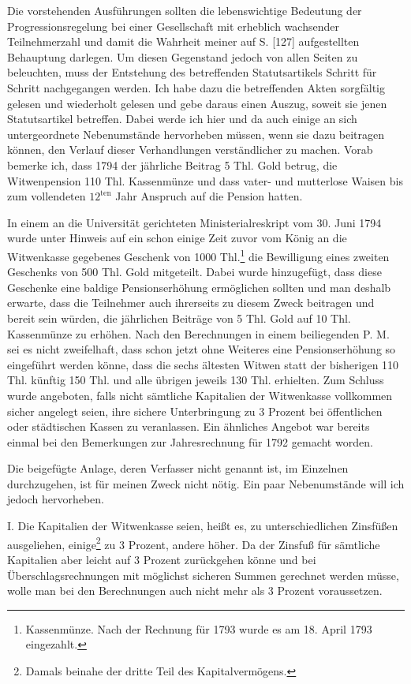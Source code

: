 Die vorstehenden Ausführungen sollten die lebenswichtige Bedeutung der Progressionsregelung bei einer Gesellschaft mit erheblich wachsender Teilnehmerzahl und damit die Wahrheit meiner auf S. [127] aufgestellten Behauptung darlegen. Um diesen Gegenstand jedoch von allen Seiten zu beleuchten, muss der Entstehung des betreffenden Statutsartikels Schritt für Schritt nachgegangen werden. Ich habe dazu die betreffenden Akten sorgfältig gelesen und wiederholt gelesen und gebe daraus einen Auszug, soweit sie jenen Statutsartikel betreffen. Dabei werde ich hier und da auch einige an sich untergeordnete Nebenumstände hervorheben müssen, wenn sie dazu beitragen können, den Verlauf dieser Verhandlungen verständlicher zu machen. Vorab bemerke ich, dass 1794 der jährliche Beitrag 5 Thl. Gold betrug, die Witwenpension 110 Thl. Kassenmünze und dass vater- und mutterlose Waisen bis zum vollendeten \(12^{\text{ten}}\) Jahr Anspruch auf die Pension hatten.

In einem an die Universität gerichteten Ministerialreskript vom 30. Juni 1794 wurde unter Hinweis auf ein schon einige Zeit zuvor vom König an die Witwenkasse gegebenes Geschenk von 1000 Thl.\footnote{Kassenmünze. Nach der Rechnung für 1793 wurde es am 18. April 1793 eingezahlt.} die Bewilligung eines zweiten Geschenks von 500 Thl. Gold mitgeteilt. Dabei wurde hinzugefügt, dass diese Geschenke eine baldige Pensionserhöhung ermöglichen sollten und man deshalb erwarte, dass die Teilnehmer auch ihrerseits zu diesem Zweck beitragen und bereit sein würden, die jährlichen Beiträge von 5 Thl. Gold auf 10 Thl. Kassenmünze zu erhöhen. Nach den Berechnungen in einem beiliegenden P. M. sei es nicht zweifelhaft, dass schon jetzt ohne Weiteres eine Pensionserhöhung so eingeführt werden könne, dass die sechs ältesten Witwen statt der bisherigen 110 Thl. künftig 150 Thl. und alle übrigen jeweils 130 Thl. erhielten. Zum Schluss wurde angeboten, falls nicht sämtliche Kapitalien der Witwenkasse vollkommen sicher angelegt seien, ihre sichere Unterbringung zu 3 Prozent bei öffentlichen oder städtischen Kassen zu veranlassen. Ein ähnliches Angebot war bereits einmal bei den Bemerkungen zur Jahresrechnung für 1792 gemacht worden.

Die beigefügte Anlage, deren Verfasser nicht genannt ist, im Einzelnen durchzugehen, ist für meinen Zweck nicht nötig. Ein paar Nebenumstände will ich jedoch hervorheben.

I. Die Kapitalien der Witwenkasse seien, heißt es, zu unterschiedlichen Zinsfüßen ausgeliehen, einige\footnote{Damals beinahe der dritte Teil des Kapitalvermögens.} zu 3 Prozent, andere höher. Da der Zinsfuß für sämtliche Kapitalien aber leicht auf 3 Prozent zurückgehen könne und bei Überschlagsrechnungen mit möglichst sicheren Summen gerechnet werden müsse, wolle man bei den Berechnungen auch nicht mehr als 3 Prozent voraussetzen.

